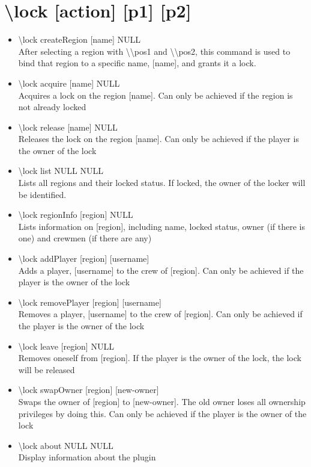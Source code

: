 \documentclass[a4paper,twoside,notitlepage,11pt]{article}
\begin{document}
\section{\textbackslash lock [action] [p1] [p2]}
\begin{itemize}
\item \textbackslash lock createRegion [name] NULL\\
After selecting a region with \textbackslash\textbackslash pos1 and \textbackslash\textbackslash pos2, this command is used to bind that region to a specific name, [name], and grants it a lock.
\item \textbackslash lock acquire [name] NULL\\
Acquires a lock on the region [name]. Can only be achieved if the region is not already locked
\item \textbackslash lock release [name] NULL\\
Releases the lock on the region [name]. Can only be achieved if the player is the owner of the lock
\item \textbackslash lock list NULL NULL\\
Lists all regions and their locked status. If locked, the owner of the locker will be identified.
\item \textbackslash lock regionInfo [region] NULL\\
Lists information on [region], including name, locked status, owner (if there is one) and crewmen (if there are any)
\item \textbackslash lock addPlayer [region] [username]\\
Adds a player, [username] to the crew of [region]. Can only be achieved if the player is the owner of the lock
\item \textbackslash lock removePlayer [region] [username]\\
Removes a player, [username] to the crew of [region]. Can only be achieved if the player is the owner of the lock
\item \textbackslash lock leave [region] NULL\\
Removes oneself from [region]. If the player is the owner of the lock, the lock will be released
\item \textbackslash lock swapOwner [region] [new-owner]\\
Swaps the owner of [region] to [new-owner]. The old owner loses all ownership privileges by doing this. Can only be achieved if the player is the owner of the lock
\item \textbackslash lock about NULL NULL \\
Display information about the plugin
\end{itemize}
\end{document}
